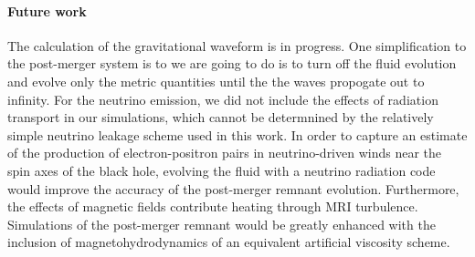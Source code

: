 \paragraph{Future work} 

The calculation of the gravitational waveform is in progress.  One simplification to the post-merger system is to  we are going to do is to turn off the fluid evolution and evolve only the metric quantities until the the waves propogate out to infinity.  For the neutrino emission, we did not include the effects of radiation transport in our simulations, which cannot be determnined by the relatively simple neutrino leakage scheme used in this work.  In order to capture an estimate of the production of electron-positron pairs in neutrino-driven winds near the spin axes of the black hole, evolving the fluid with a neutrino radiation code would improve the accuracy of the post-merger remnant evolution.  Furthermore, the effects of magnetic fields contribute heating through MRI turbulence.  Simulations of the post-merger remnant would be greatly enhanced with the inclusion of magnetohydrodynamics of an equivalent artificial viscosity scheme. 


